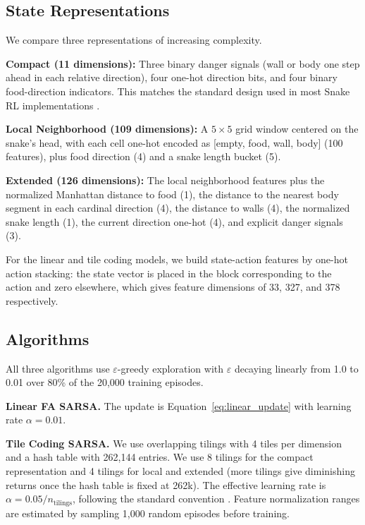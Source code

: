 \documentclass[letterpaper]{article}
\begin{document}
\subsection{State Representations}

We compare three representations of increasing complexity.

\textbf{Compact (11 dimensions):} Three binary danger signals (wall or body one step ahead in each relative direction), four one-hot direction bits, and four binary food-direction indicators. This matches the standard design used in most Snake RL implementations \cite{loeber2020snakeai,zhou2023snake}.

\textbf{Local Neighborhood (109 dimensions):} A $5 \times 5$ grid window centered on the snake's head, with each cell one-hot encoded as [empty, food, wall, body] (100 features), plus food direction (4) and a snake length bucket (5).

\textbf{Extended (126 dimensions):} The local neighborhood features plus the normalized Manhattan distance to food (1), the distance to the nearest body segment in each cardinal direction (4), the distance to walls (4), the normalized snake length (1), the current direction one-hot (4), and explicit danger signals (3).

For the linear and tile coding models, we build state-action features by one-hot action stacking: the state vector is placed in the block corresponding to the action and zero elsewhere, which gives feature dimensions of 33, 327, and 378 respectively.

\subsection{Algorithms}

All three algorithms use $\varepsilon$-greedy exploration with $\varepsilon$ decaying linearly from 1.0 to 0.01 over 80\% of the 20,000 training episodes.

\textbf{Linear FA SARSA.} The update is Equation~\ref{eq:linear_update} with learning rate $\alpha = 0.01$.

\textbf{Tile Coding SARSA.} We use overlapping tilings with 4 tiles per dimension and a hash table with 262,144 entries. We use 8 tilings for the compact representation and 4 tilings for local and extended (more tilings give diminishing returns once the hash table is fixed at 262k). The effective learning rate is $\alpha = 0.05 / n_{\text{tilings}}$, following the standard convention \cite{sutton2018reinforcement}. Feature normalization ranges are estimated by sampling 1,000 random episodes before training.
\end{document}

